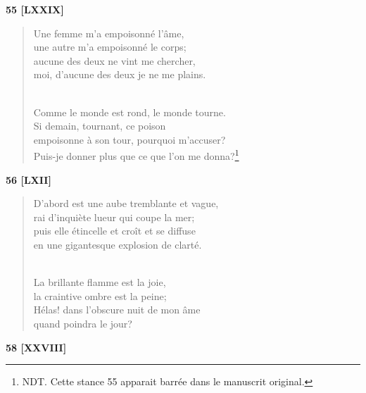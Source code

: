 \documentclass[a4paper,12pt]{book}
\begin{document}
\bigskip

\begin{center} {\bf 55 [LXXIX]} \end{center}

\begin{verse}
Une femme m'a empoisonné l'âme, \\
une autre m'a empoisonné le corps; \\
aucune des deux ne vint me chercher, \\
moi, d'aucune des deux je ne me plains. \\ \

Comme le monde est rond, le monde tourne. \\
Si demain, tournant, ce poison \\
empoisonne à son tour, pourquoi m'accuser? \\
Puis-je donner plus que ce que l'on me donna?\footnote{NDT. Cette stance 55 apparait barrée dans le manuscrit original.} \\
\end{verse}

\bigskip

\begin{center} {\bf 56 [LXII]} \end{center}

\begin{verse}
D'abord est une aube tremblante et vague, \\
rai d'inquiète lueur qui coupe la mer; \\
puis elle étincelle et croît et se diffuse \\
en une gigantesque explosion de clarté. \\ \

La brillante flamme est la joie, \\
la craintive ombre est la peine; \\
Hélas! dans l'obscure nuit de mon âme \\
quand poindra le jour? \\
\end{verse}

\bigskip

\begin{center} {\bf 58 [XXVIII]} \end{center}
\end{document}
